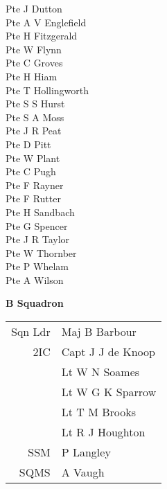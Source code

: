 \begin{multicols}{3}
  Pte J Dutton \\
  Pte A V Englefield \\
  Pte H Fitzgerald \\
  Pte W Flynn \\
  Pte C Groves \\
  Pte H Hiam \\
  Pte T Hollingworth \\
  Pte S S Hurst \\
  Pte S A Moss \\
  Pte J R Peat \\
  Pte D Pitt \\
  Pte W Plant \\
  Pte C Pugh \\
  Pte F Rayner \\
  Pte F Rutter \\
  Pte H Sandbach \\
  Pte G Spencer \\
  Pte J R Taylor \\
  Pte W Thornber \\
  Pte P Whelam \\
  Pte A Wilson \\
\end{multicols}

\vspace*{10mm}

\begin{center}
  \Large
  \textbf{B Squadron}
\end{center}

\begin{center}
  \begin{tabular}{rl}
    Sqn Ldr & Maj B Barbour \\
    2IC & Capt J J de Knoop \\
    & Lt W N Soames \\
    & Lt W G K Sparrow \\
    & Lt T M Brooks \\
    & Lt R J Houghton \\
    SSM & P Langley \\
    SQMS & A Vaugh \\
  \end{tabular}
\end{center}

